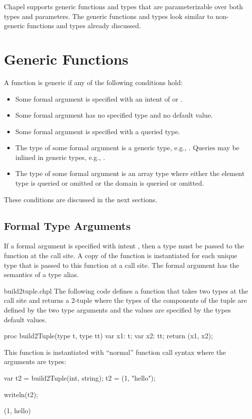 \label{Generics}

Chapel supports generic functions and types that are parameterizable
over both types and parameters.  The generic functions and types look
similar to non-generic functions and types already discussed.

\section{Generic Functions}
\label{Generic_Functions}

A function is generic if any of the following conditions hold:
\begin{itemize}
\item
Some formal argument is specified with an intent of  or
.
\item
Some formal argument has no specified type and no default value.
\item
Some formal argument is specified with a queried type.
\item
The type of some formal argument is a generic type, e.g., .
Queries may be inlined in generic types, e.g., .
\item
The type of some formal argument is an array type where either the
element type is queried or omitted or the domain is queried or
omitted.
\end{itemize}
These conditions are discussed in the next sections.

\subsection{Formal Type Arguments}
\label{Formal_Type_Arguments}

If a formal argument is specified with intent , then a type
must be passed to the function at the call site.  A copy of the
function is instantiated for each unique type that is passed to this
function at a call site.  The formal argument has the semantics of a
type alias.
\begin{chapelexample}{build2tuple.chpl}
The following code defines a function that takes two types at the call
site and returns a 2-tuple where the types of the components of the
tuple are defined by the two type arguments and the values are
specified by the types default values.
\begin{chapel}
proc build2Tuple(type t, type tt) {
  var x1: t;
  var x2: tt;
  return (x1, x2);
}
\end{chapel}
This function is instantiated with ``normal'' function call syntax
where the arguments are types:
\begin{chapel}
var t2 = build2Tuple(int, string);
t2 = (1, "hello");
\end{chapel}
\begin{chapelpost}
writeln(t2);
\end{chapelpost}
\begin{chapeloutput}
(1, hello)
\end{chapeloutput}
\end{chapelexample}

